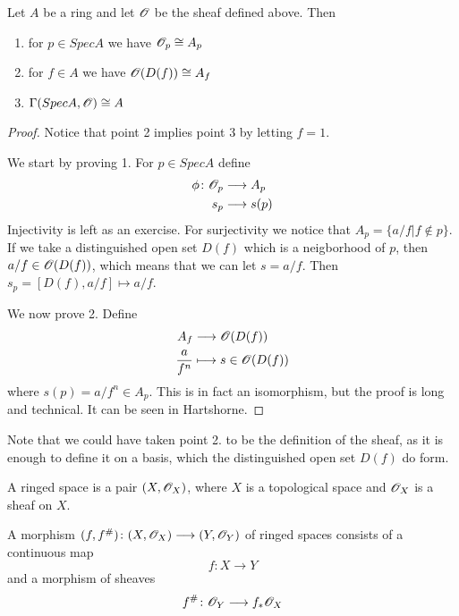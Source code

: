 \begin{proposition}
Let $A$ be a ring and let $\mathscr{O}$ be the sheaf defined above. Then 
\begin{enumerate}
    \item for $p\in Spec A$ we have $\mathscr{O}_p\cong A_p$
    \item for $f\in A$ we have $\mathscr{O}(D(f))\cong A_f$
    \item $\Gamma(Spec A, \mathscr{O})\cong A$
\end{enumerate}
\end{proposition}

\begin{proof}
Notice that point 2 implies point 3 by letting $f=1$. 

We start by proving 1. For $p\in Spec A$ define 
\begin{align*}
    \phi\colon \mathscr{O}_p &\longrightarrow A_p \\
    s_p&\longrightarrow s(p)
\end{align*}
Injectivity is left as an exercise. For surjectivity we notice that $A_p = \{ a/f | f\notin p \}$. If we take a distinguished open set $D(f)$ which is a neigborhood of $p$, then $a/f\in \mathscr{O}(D(f))$, which means that we can let $s=a/f$. Then $s_p = [D(f), a/f]\mapsto a/f$. 

We now prove 2. Define
\begin{align*}
    A_f &\longrightarrow \mathscr{O}(D(f)) \\
    \frac{a}{f^n} &\longmapsto s\in \mathscr{O}(D(f))
\end{align*}
where $s(p)=a/f^n \in A_p$. This is in fact an isomorphism, but the proof is long and technical. It can be seen in Hartshorne. 
\end{proof}

Note that we could have taken point 2. to be the definition of the sheaf, as it is enough to define it on a basis, which the distinguished open set $D(f)$ do form. 

\begin{definition}
A ringed space is a pair $(X, \mathscr{O}_X)$, where $X$ is a topological space and $\mathscr{O}_X$ is a sheaf on $X$. 
\end{definition}

\begin{definition}
A morphism $(f, f^\#)\colon (X, \mathscr{O}_X)\longrightarrow (Y,\mathscr{O}_Y)$ of ringed spaces consists of a continuous map 
\begin{equation*}
    f\colon X\longrightarrow Y
\end{equation*}
and a morphism of sheaves 
\begin{equation*}
    f^\#\colon \mathscr{O}_Y\longrightarrow f_*\mathscr{O}_X
\end{equation*}
\end{definition}

